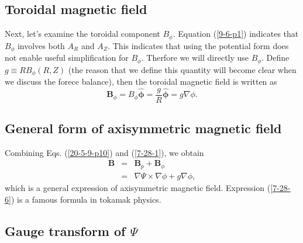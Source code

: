 \documentclass{llncs}
\newcommand{\tmmathbf}[1]{\ensuremath{\boldsymbol{#1}}}
\begin{document}
\subsection{Toroidal magnetic field}

Next, let's examine the toroidal component $B_{\phi}$. Equation (\ref{9-6-p1})
indicates that $B_{\phi}$ involves both $A_R$ and $A_Z$. This indicates that
using the potential form does not enable useful simplification for $B_{\phi}$.
Therfore we will directly use $B_{\phi}$. Define $g \equiv R B_{\phi} (R, Z)$
(the reason that we define this quantity will become clear when we discuss the
forece balance), then the toroidal magnetic field is written as
\begin{equation}
  \label{7-28-1} \mathbf{B}_{\phi} = B_{\phi} \hat{\tmmathbf{\phi}} =
  \frac{g}{R} \hat{\tmmathbf{\phi}} = g \nabla \phi .
\end{equation}

\subsection{General form of axisymmetric magnetic field}

Combining Eqs. (\ref{20-5-9-p10}) and (\ref{7-28-1}), we obtain
\begin{eqnarray}
  \mathbf{B} & = & \mathbf{B}_p +\mathbf{B}_{\phi} \nonumber\\
  & = & \nabla \Psi \times \nabla \phi + g \nabla \phi,  \label{7-28-6}
\end{eqnarray}
which is a general expression of axisymmetric magnetic field. Expression
(\ref{7-28-6}) is a famous formula in tokamak physics.

\subsection{Gauge transform of $\Psi$}
\end{document}
